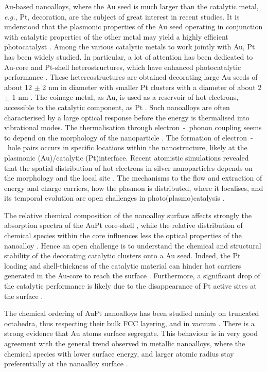 Au-based nanoalloys, where the Au seed is much larger than the catalytic metal, \textit{e.g.,} Pt, decoration, are the subject of great interest in recent studies. It is understood that the plasmonic properties of the Au seed operating in conjunction with catalytic properties of the other metal may yield a highly efficient photocatalyst \cite{Cortes2020,Zhang2019}.
Among the various catalytic metals to work jointly with Au, Pt has been widely studied. In particular, a lot of attention has been dedicated to Au-core and Pt-shell heterostructures, which have enhanced photocatalytic performance \cite{Adzic2013,Xia2017}. 
These hetereostructures are obtained decorating large Au seeds of about 12 $\pm$ 2 nm in diameter with smaller Pt clusters with a diameter of about 2 $\pm$ 1 nm \cite{Kunwar2019,Engelbrekt2021,Linic2021,Fagan2021}. The coinage metal, as Au, is used as a reservoir of hot electrons, accessible to the catalytic component, as Pt \cite{Xia2017}. Such nanoalloys are often characterised by a large optical response before the energy is thermalised into vibrational modes. The thermalisation through electron~-~phonon coupling seems to depend on the morphology of the nanoparticle \cite{Staechelin2021}. The formation of electron~-~hole pairs occurs in specific locations within the nanostructure, likely at the plasmonic (Au)/catalytic (Pt)interface. Recent atomistic simulations revealed that the spatial distribution of hot electrons in silver nanoparticles depends on the morphology and the local site \cite{TRossi2020}.
The mechanisms to the flow and extraction of energy and charge carriers, how the plasmon is distributed, where it localises, and its temporal evolution are open challenges in photo(plasmo)catalysis \cite{Linic2021}.

The relative chemical composition of the nanoalloy surface affects strongly the absorption spectra of the AuPt core-shell \cite{Rocha2021}, while the relative distribution of chemical species within the core influences less the optical properties of the nanoalloy \cite{Stener2021}.
Hence an open challenge is to understand the chemical and structural stability of the decorating catalytic clusters onto a Au seed. Indeed, the Pt loading and shell-thickness of the catalytic material can hinder hot carriers generated in the Au-core to reach the surface \cite{Jorge2021}.
Furthermore, a significant drop of the catalytic performance is likely due to the disappearance of Pt active sites at the surface \cite{Jorge2019}.

The chemical ordering of AuPt nanoalloys has been studied mainly on truncated octahedra, thus respecting their bulk FCC layering, and in vacuum \cite{Divi2016, Jagannath2018,Stener2021}. There is a strong evidence that Au atoms surface segregate. This behaviour is in very good agreement with the general trend observed in metallic nanoalloys, where the chemical species with lower surface energy, and larger atomic radius stay preferentially at the nanoalloy surface \cite{Namsoon2021}.

